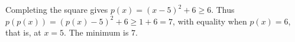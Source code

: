 Completing the square gives $p(x)=(x-5)^2+6\ge6$. Thus $p(p(x))=(p(x)-5)^2+6\ge1+6=7$, with equality when $p(x)=6$, that is, at $x=5$. The minimum is $\boxed7$.

